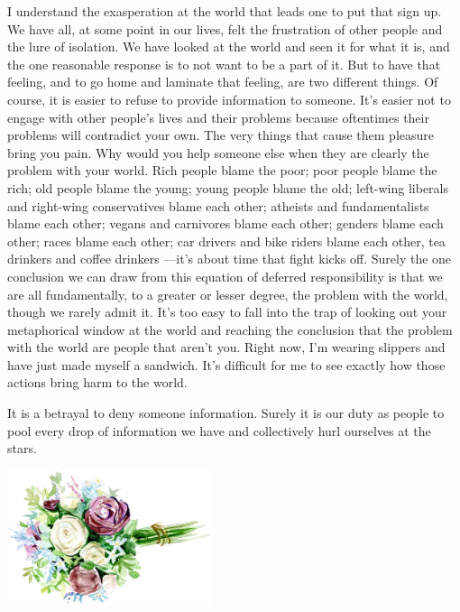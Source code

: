 

I understand the exasperation at the world that leads one to put that sign up. We have all, at some point in our lives, felt the frustration of other people and the lure of isolation. We have looked at the world and seen it for what it is, and the one reasonable response is to not want to be a part of it. But to have that feeling, and to go home and laminate that feeling, are two different things. Of course, it is easier to refuse to provide information to someone. It's easier not to engage with other people's lives and their problems because oftentimes their problems will contradict your own. The very things that cause them pleasure bring you pain. Why would you help someone else when they are clearly the problem with your world. Rich people blame the poor; poor people blame the rich; old people blame the young; young people blame the old; left-wing liberals and right-wing conservatives blame each other; atheists and fundamentalists blame each other; vegans and carnivores blame each other; genders blame each other; races blame each other; car drivers and bike riders blame each other, tea drinkers and coffee drinkers ---it's about time that fight kicks off. Surely the one conclusion we can draw from this equation of deferred responsibility is that we are all fundamentally, to a greater or lesser degree, the problem with the world, though we rarely admit it. It's too easy to fall into the trap of looking out your metaphorical window at the world and reaching the conclusion that the problem with the world are people that aren't you. Right now, I'm wearing slippers and have just made myself a sandwich. It's difficult for me to see exactly how those actions bring harm to the world. 

It is a betrayal to deny someone information. Surely it is our duty as people to pool every drop of information we have and collectively hurl ourselves at the stars.

\vspace{5mm}
\begin{center}
\includegraphics[width=0.45\textwidth]{graphics/flower.jpg}
\end{center}
